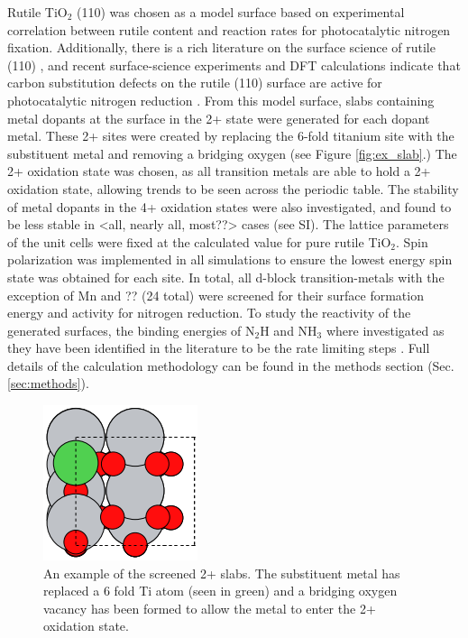 Rutile TiO$_2$ (110) was chosen as a model surface based on experimental correlation between rutile content and reaction rates for photocatalytic nitrogen fixation\cite{Schrauzer_1977}. Additionally, there is a rich literature on the surface science of rutile (110) \cite{Diebold2003,Yates_1991,Lu1994,Walle2009}, and recent surface-science experiments and DFT calculations indicate that carbon substitution defects on the rutile (110) surface are active for photocatalytic nitrogen reduction \cite{Comer_2018b}. From this model surface, slabs containing metal dopants at the surface in the 2+ state were generated for each dopant metal. These 2+ sites were created by replacing the 6-fold titanium site with the substituent metal and removing a bridging oxygen (see Figure \ref{fig:ex_slab}.) The 2+ oxidation state was chosen, as all transition metals are able to hold a 2+ oxidation state\cite{Greenwood_chemistry_text_book}, allowing trends to be seen across the periodic table. The stability of metal dopants in the 4+ oxidation states were also investigated, and found to be less stable in <all, nearly all, most??> cases (see SI). The lattice parameters of the unit cells were fixed at the calculated value for pure rutile TiO$_2$. Spin polarization was implemented in all simulations to ensure the lowest energy spin state was obtained for each site. In total, all d-block transition-metals with the exception of Mn and ?? (24 total) were screened for their surface formation energy and activity for nitrogen reduction.  To study the reactivity of the generated surfaces, the binding energies of N$_2$H and NH$_3$ where investigated as they have been identified in the literature to be the rate limiting steps \cite{Hoskuldsson_2017, Montoya_2015, Comer_2018,}. Full details of the calculation methodology can be found in the methods section (Sec. \ref{sec:methods}).


\begin{figure}
    \centering
    \includegraphics[width=0.5\linewidth]{Images/ex_2+_slab.png}
    \caption{An example of the screened 2+ slabs. The substituent metal has replaced a 6 fold Ti atom (seen in green) and a bridging oxygen vacancy has been formed to allow the metal to enter the 2+ oxidation state.}
    \label{fig:2+_ex_slab}
\end{figure}


